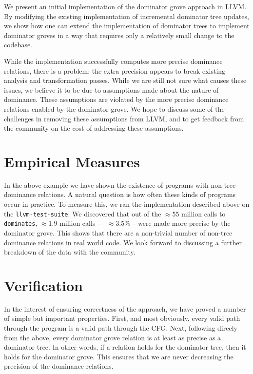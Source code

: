 \documentclass[a4paper,twocolumn]{article}
\begin{document}
We present an initial implementation of the dominator grove approach in LLVM.
By modifying the existing implementation of incremental dominator tree updates,
we show how one can extend the implementation of dominator trees to implement
dominator groves in a way that requires only a relatively small change to the
codebase.\cite{georgiadis2012experimental}

While the implementation successfully computes more precise dominance
relations, there is a problem: the extra precision appears to break existing
analysis and transformation passes. While we are still not sure what causes 
these issues, we believe it to be due to assumptions made about the nature of
dominance. These assumptions are violated by the more precise dominance
relations enabled by the dominator grove. We hope to discuss some of the challenges in
removing these assumptions from LLVM, and to get feedback from the community on
the cost of addressing these assumptions.

\section*{Empirical Measures}
In the above example we have shown the existence of programs with non-tree
dominance relations. A natural question is how often these kinds of
programs occur in practice. To measure this, we ran the implementation
described above on the \texttt{llvm-test-suite}. We discovered that out of the
$\approx55$ million calls to \texttt{dominates}, $\approx1.9$ million calls
--- $\approx 3.5\%$ -- were made
more precise by the dominator grove. This shows that there are
a non-trivial number of non-tree dominance relations in real world code. We
look forward to discussing a further breakdown of the data with the community.

\section*{Verification}
In the interest of ensuring correctness of the approach, we have proved a number
of simple but important properties. First, and most obviously, every valid path 
through the program is a valid path through the CFG. Next, following direcly
from the above, every dominator grove relation is at least as precise 
as a dominator tree. In other words, if a relation holds for the dominator tree, 
then it holds for the dominator grove. This ensures that we are never
decreasing the precision of the dominance relations.
\end{document}
